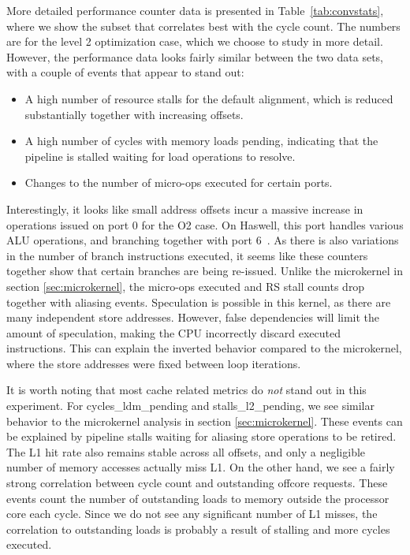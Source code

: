 \documentclass[prodmode,acmtaco]{acmsmall}
\begin{document}
More detailed performance counter data is presented in Table~\ref{tab:convstats}, where we show the subset that correlates best with the cycle count.
The numbers are for the level 2 optimization case, which we choose to study in more detail.
However, the performance data looks fairly similar between the two data sets, with a couple of events that appear to stand out:
\begin{itemize}
    \item A high number of resource stalls for the default alignment, which is reduced substantially together with increasing offsets. 
    \item A high number of cycles with memory loads pending, indicating that the pipeline is stalled waiting for load operations to resolve.
    \item Changes to the number of micro-ops executed for certain ports.
\end{itemize}

Interestingly, it looks like small address offsets incur a massive increase in operations issued on port 0 for the O2 case.
On Haswell, this port handles various ALU operations, and branching together with port 6~\cite[Figure 2.1]{OptimizationManual}.
As there is also variations in the number of branch instructions executed, it seems like these counters together show that certain branches are being re-issued.
Unlike the microkernel in section \ref{sec:microkernel}, the micro-ops executed and RS stall counts drop together with aliasing events.
Speculation is possible in this kernel, as there are many independent store addresses.
However, false dependencies will limit the amount of speculation, making the CPU incorrectly discard executed instructions.
This can explain the inverted behavior compared to the microkernel, where the store addresses were fixed between loop iterations.

It is worth noting that most cache related metrics do \emph{not} stand out in this experiment.
For cycles\_ldm\_pending and stalls\_l2\_pending, we see similar behavior to the microkernel analysis in section \ref{sec:microkernel}.
These events can be explained by pipeline stalls waiting for aliasing store operations to be retired.
The L1 hit rate also remains stable across all offsets, and only a negligible number of memory accesses actually miss L1.
On the other hand, we see a fairly strong correlation between cycle count and outstanding offcore requests. 
These events count the number of outstanding loads to memory outside the processor core each cycle.
Since we do not see any significant number of L1 misses, the correlation to outstanding loads is probably a result of stalling and more cycles executed.
\end{document}
